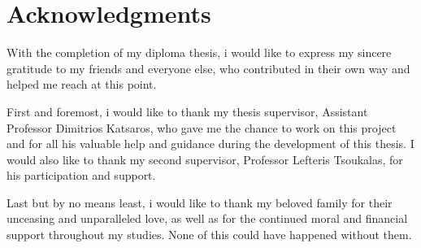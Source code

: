 \documentclass[a4paper, 12pt]{article}
\numberwithin{equation}{section}
\numberwithin{figure}{section}
\numberwithin{table}{section}
\begin{document}
	\newpage
	
	\section*{Acknowledgments}
	
	With the completion of my diploma thesis, i would like to express my sincere gratitude to my friends and everyone else, who contributed in their own way and helped me reach at this point.
	\par
	
	First and foremost, i would like to thank my thesis supervisor, Assistant Professor Dimitrios Katsaros, who gave me the chance to work on this project and for all his valuable help and guidance during the development of this thesis.
	I would also like to thank my second supervisor, Professor Lefteris Tsoukalas, for his participation and support.\par
	
	Last but by no means least, i would like to thank my beloved family for their unceasing and unparalleled love, as well as for the continued moral and financial support throughout my studies. None of this could have happened without them.\par
	
	\newpage

	{
		\hypersetup{linkcolor=black}
		\tableofcontents
	}
	\newpage
	
	{
		\hypersetup{linkcolor=black}
		\listoffigures
	}
	
	\newpage
	
	{
		\hypersetup{linkcolor=black}
		\listoftables
	}
	
	\newpage
	
	
\end{document}
